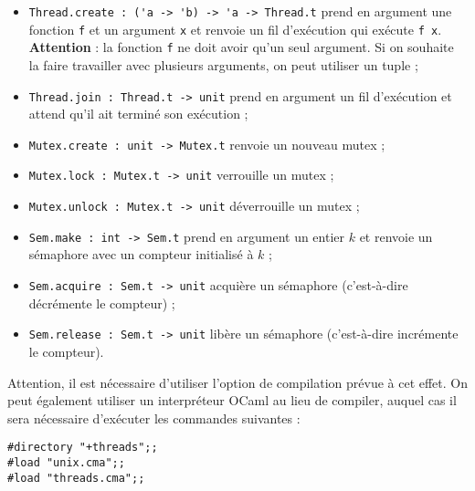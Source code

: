 \documentclass[10pt]{article}
\begin{document}
\begin{itemize}
\item \verb"Thread.create : ('a -> 'b) -> 'a -> Thread.t" prend en argument une fonction \verb"f" et un argument \verb"x" et renvoie un fil d'exécution qui exécute \verb"f x". \textbf{Attention} : la fonction \verb"f" ne doit avoir qu'un seul argument. Si on souhaite la faire travailler avec plusieurs arguments, on peut utiliser un tuple ;
\item \verb"Thread.join : Thread.t -> unit" prend en argument un fil d'exécution et attend qu'il ait terminé son exécution ;
\item \verb"Mutex.create : unit -> Mutex.t" renvoie un nouveau mutex ;
\item \verb"Mutex.lock : Mutex.t -> unit" verrouille un mutex ;
\item \verb"Mutex.unlock : Mutex.t -> unit" déverrouille un mutex ;
\item \verb"Sem.make : int -> Sem.t" prend en argument un entier $k$ et renvoie un sémaphore avec un compteur initialisé à $k$ ;
\item \verb"Sem.acquire : Sem.t -> unit" acquière un sémaphore (c'est-à-dire décrémente le compteur) ;
\item \verb"Sem.release : Sem.t -> unit" libère un sémaphore (c'est-à-dire incrémente le compteur).
\end{itemize}

Attention, il est nécessaire d'utiliser l'option de compilation prévue à cet effet. On peut également utiliser un interpréteur OCaml au lieu de compiler, auquel cas il sera nécessaire d'exécuter les commandes suivantes :
\begin{cbox}
   \begin{verbatim}
#directory "+threads";;
#load "unix.cma";;
#load "threads.cma";;
   \end{verbatim}
\end{cbox}
\end{document}
